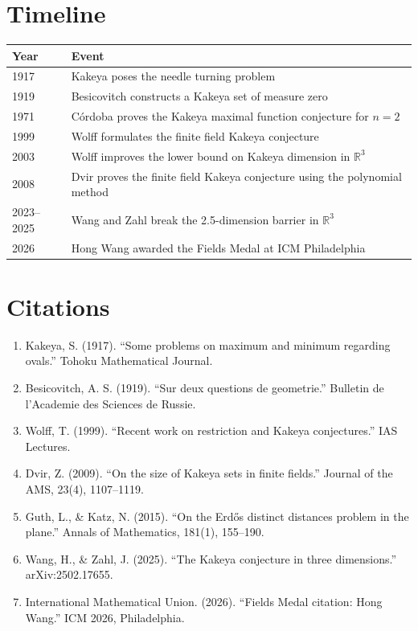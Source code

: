 \section{Timeline}

\begin{tabularx}{\linewidth}{lX}
\toprule
\textbf{Year} & \textbf{Event} \\ \midrule
1917 & Kakeya poses the needle turning problem \cite{kakeya1917} \\
1919 & Besicovitch constructs a Kakeya set of measure zero \cite{besicovitch1919} \\
1971 & C\'ordoba proves the Kakeya maximal function conjecture for $n=2$ \\
1999 & Wolff formulates the finite field Kakeya conjecture \cite{wolff1999} \\
2003 & Wolff improves the lower bound on Kakeya dimension in $\mathbb{R}^3$ \\
2008 & Dvir proves the finite field Kakeya conjecture using the polynomial method \cite{dvir2009} \\
2023--2025 & Wang and Zahl break the 2.5-dimension barrier in $\mathbb{R}^3$ \cite{wangzahl2024} \\
2026 & Hong Wang awarded the Fields Medal at ICM Philadelphia \\
\bottomrule
\end{tabularx}

\section{Citations}

\begin{enumerate}
\item Kakeya, S. (1917). ``Some problems on maximum and minimum regarding ovals.'' Tohoku Mathematical Journal.
\item Besicovitch, A. S. (1919). ``Sur deux questions de geometrie.'' Bulletin de l'Academie des Sciences de Russie.
\item Wolff, T. (1999). ``Recent work on restriction and Kakeya conjectures.'' IAS Lectures.
\item Dvir, Z. (2009). ``On the size of Kakeya sets in finite fields.'' Journal of the AMS, 23(4), 1107--1119.
\item Guth, L., \& Katz, N. (2015). ``On the Erd\H{o}s distinct distances problem in the plane.'' Annals of Mathematics, 181(1), 155--190.
\item Wang, H., \& Zahl, J. (2025). ``The Kakeya conjecture in three dimensions.'' arXiv:2502.17655.
\item International Mathematical Union. (2026). ``Fields Medal citation: Hong Wang.'' ICM 2026, Philadelphia.
\end{enumerate}
